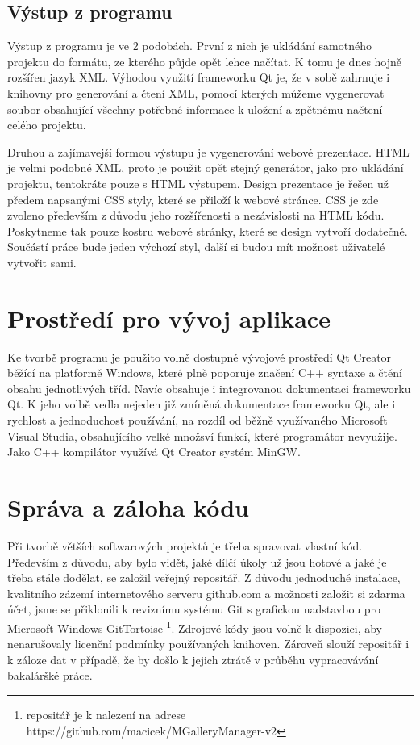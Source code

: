 \documentclass[11pt,twoside,a4paper]{book}
\begin{document}
\subsection{Výstup z programu}
\noindent
Výstup z programu je ve 2 podobách. První z nich je ukládání samotného projektu do formátu, ze kterého půjde opět lehce načítat. K tomu je dnes hojně rozšířen jazyk XML. Výhodou využití frameworku Qt je, že v sobě zahrnuje i knihovny pro generování a čtení XML, pomocí kterých můžeme vygenerovat soubor obsahující všechny potřebné informace k uložení a zpětnému načtení celého projektu.

\indent
Druhou a zajímavejší formou výstupu je vygenerování webové prezentace. HTML je velmi podobné XML, proto je použit opět stejný generátor, jako pro ukládání projektu, tentokráte pouze s HTML výstupem. Design prezentace je řešen už předem napsanými CSS styly, které se přiloží k webové stránce. CSS je zde zvoleno především z důvodu jeho rozšířenosti a nezávislosti na HTML kódu. Poskytneme tak pouze kostru webové stránky, které se design vytvoří dodatečně. Součástí práce bude jeden výchozí styl, další si budou mít možnost uživatelé vytvořit sami.


\section{Prostředí pro vývoj aplikace}
\noindent
Ke tvorbě programu je použito volně dostupné vývojové prostředí Qt Creator běžící na platformě Windows, které plně poporuje značení C++ syntaxe a čtění obsahu jednotlivých tříd. Navíc obsahuje i integrovanou dokumentaci frameworku Qt. K jeho volbě vedla nejeden již zmíněná dokumentace frameworku Qt, ale i rychlost a jednoduchost používání, na rozdíl od běžně využívaného Microsoft Visual Studia, obsahujícího velké množsví funkcí, které programátor nevyužije. Jako C++ kompilátor využívá Qt Creator systém MinGW.

\section{Správa a záloha kódu}
\noindent
Při tvorbě větších softwarových projektů je třeba spravovat vlastní kód. Především z důvodu, aby bylo vidět, jaké dílčí úkoly už jsou hotové a jaké je třeba stále dodělat, se založil veřejný repositář. Z důvodu jednoduché instalace, kvalitního zázemí internetového serveru github.com a možnosti založit si zdarma účet, jsme se přiklonili k reviznímu systému Git s grafickou nadstavbou pro Microsoft Windows GitTortoise \footnote{repositář je k nalezení na adrese https://github.com/macicek/MGalleryManager-v2}. Zdrojové kódy jsou volně k dispozici, aby nenarušovaly licenční podmínky používaných knihoven. Zároveň slouží repositář i k záloze dat v případě, že by došlo k jejich ztrátě v průběhu vypracovávání bakaláršké práce.
\end{document}
